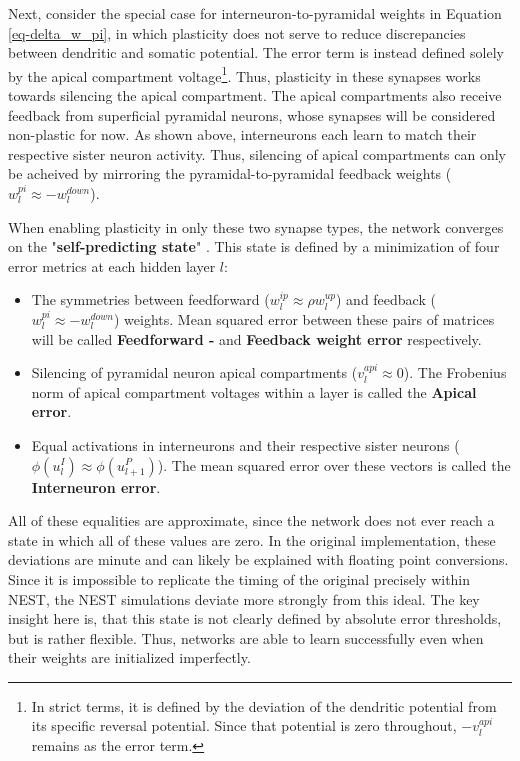 Next, consider the special case for interneuron-to-pyramidal weights in Equation \ref{eq-delta_w_pi}, in which
plasticity does not serve to reduce discrepancies between dendritic and somatic potential. The error term is instead
defined solely by the apical compartment voltage\footnote{In strict terms, it is defined by the deviation of the
dendritic potential from its specific reversal potential. Since that potential is zero throughout, $- v_l^{api}$ remains
as the error term.}. Thus, plasticity in these synapses works towards silencing the apical compartment. The apical
compartments also receive feedback from superficial pyramidal neurons, whose synapses will be considered non-plastic for
now. As shown above, interneurons each learn to match their respective sister neuron activity. Thus, silencing of apical
compartments can only be acheived by mirroring the pyramidal-to-pyramidal feedback weights ($w_l^{pi} \approx
  -w_l^{down}$).\newline

When enabling plasticity in only these two synapse types, the network converges on the "\textbf{self-predicting state}"
\citep{sacramento2018dendritic}. This state is defined by a minimization of four error metrics at each hidden layer $l$:

\begin{itemize}
  \item The symmetries between feedforward ($w_l^{ip} \approx \rho w_l^{up}$) and feedback ($w_l^{pi} \approx
          -w_l^{down}$) weights. Mean squared error between these pairs of matrices will be called \textbf{Feedforward -
        } and \textbf{Feedback weight error} respectively.
  \item Silencing of pyramidal neuron apical compartments ($v_l^{api} \approx 0$). The Frobenius norm \citeme of apical
        compartment voltages within a layer is called the \textbf{Apical error}.
  \item Equal activations in interneurons and their respective sister neurons ($\phi (u_l^I) \approx \phi (u_{l+1}^P)$).
        The mean squared error over these vectors is called the \textbf{Interneuron error}.
\end{itemize}


All of these equalities are approximate, since the network does not ever reach a state in which all of these values are
zero. In the original implementation, these deviations are minute and can likely be explained with floating point
conversions. Since it is impossible to replicate the timing of the original precisely within NEST, the NEST simulations
deviate more strongly from this ideal. The key insight here is, that this state is not clearly defined by absolute error
thresholds, but is rather flexible. Thus, networks are able to learn successfully even when their weights are
initialized imperfectly. 

